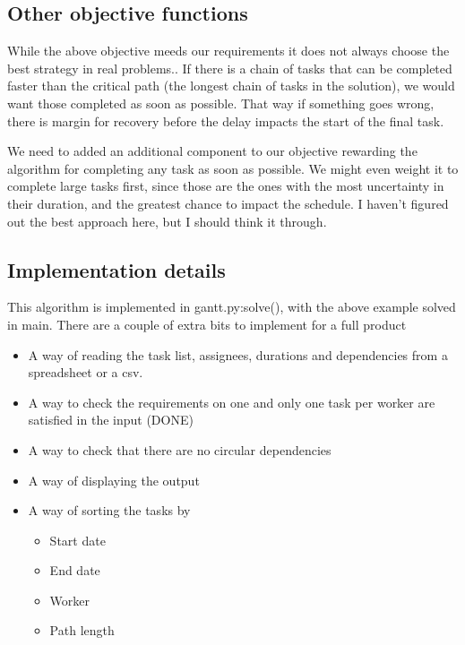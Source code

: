 \documentclass[12pt]{article}
\begin{document}
\subsection*{Other objective functions}
While the above objective meeds our requirements it does not always choose the best strategy in real problems.. If there is a chain of tasks that can be completed faster than the critical path (the longest chain of tasks in the solution), we would want those completed as soon as possible. That way if something goes wrong, there is margin for recovery before the delay impacts the start of the final task. 

We need to added an additional component to our objective rewarding the algorithm for completing any task as soon as possible. We might even weight it to complete large tasks first, since those are the ones with the most uncertainty in their duration, and the greatest chance to impact the schedule. I haven't figured out the best approach here, but I should think it through.

\subsection*{Implementation details}
This algorithm is implemented in gantt.py:solve(), with the above example solved in main. There are a couple of extra bits to implement for a full product

\begin{itemize}
\item A way of reading the task list, assignees, durations and dependencies from a spreadsheet or a csv.
\item A way to check the requirements on one and only one task per worker are satisfied in the input (DONE)
\item A way to check that there are no circular dependencies 
\item A way of displaying the output
\item A way of sorting the tasks by
    \begin{itemize}
    \item Start date
    \item End date
    \item Worker
    \item Path length
    \end{itemize}
\end{itemize}
\end{document}
